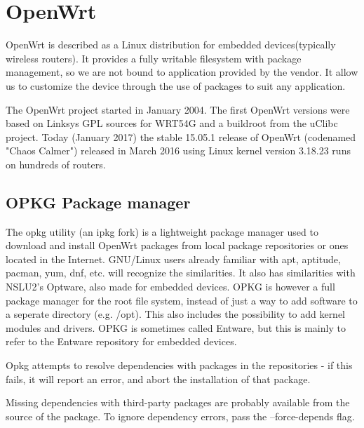 \documentclass[../xdudla00-porting-Tang-to-Open-WRT.tex]{subfiles}
\begin{document}
\chapter{OpenWrt}\label{owrt}

OpenWrt is described as a Linux distribution for embedded devices(typically wireless routers).
It provides a fully writable filesystem with package management, so we are not bound to application provided by the vendor.
It allow us to customize the device through the use of packages to suit any application.

The OpenWrt project started in January 2004.
The first OpenWrt versions were based on Linksys GPL sources for WRT54G and a buildroot from the uClibc project.
Today (January 2017) the stable 15.05.1 release of OpenWrt (codenamed "Chaos Calmer") released in March 2016 using Linux kernel version 3.18.23 runs on hundreds of routers.

\section{OPKG Package manager}

The opkg utility (an ipkg fork) is a lightweight package manager used to download and install OpenWrt packages from local package repositories or ones located in the Internet.
GNU/Linux users already familiar with apt, aptitude, pacman, yum, dnf, etc. will recognize the similarities.
It also has similarities with NSLU2's Optware, also made for embedded devices.
OPKG is however a full package manager for the root file system, instead of just a way to add software to a seperate directory (e.g. /opt).
This also includes the possibility to add kernel modules and drivers.
OPKG is sometimes called Entware, but this is mainly to refer to the Entware repository for embedded devices.

Opkg attempts to resolve dependencies with packages in the repositories - if this fails, it will report an error, and abort the installation of that package. 

Missing dependencies with third-party packages are probably available from the source of the package.
To ignore dependency errors, pass the --force-depends flag.
\end{document}
